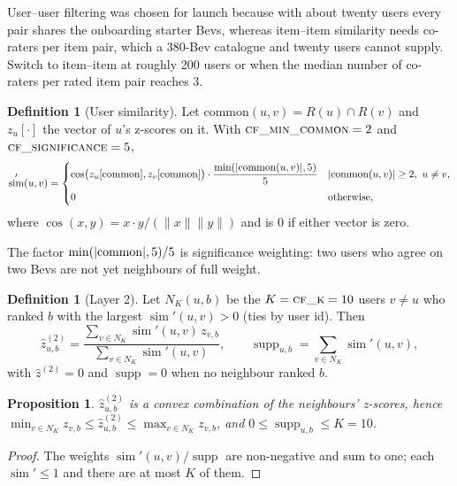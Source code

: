 \documentclass[11pt]{article}
\DeclarePairedDelimiter\abs{\lvert}{\rvert}
\DeclareMathOperator{\simi}{sim}
\DeclareMathOperator{\cosim}{cos}
\DeclareMathOperator{\supp}{supp}
\newcommand{\zhat}{\hat{z}}
\theoremstyle{plain}
\newtheorem{proposition}[theorem]{Proposition}
\theoremstyle{definition}
\newtheorem{definition}[theorem]{Definition}
\theoremstyle{remark}
\begin{document}
User--user filtering was chosen for launch because with about twenty users every pair shares the onboarding starter Bevs, whereas item--item similarity needs co-raters per item pair, which a 380-Bev catalogue and twenty users cannot supply. Switch to item--item at roughly 200 users or when the median number of co-raters per rated item pair reaches 3.

\begin{definition}[User similarity]\label{def:usersim}
Let $\mathrm{common}(u, v) = R(u) \cap R(v)$ and $z_u[\cdot]$ the vector of $u$'s z-scores on it. With $\textsc{cf\_min\_common} = 2$ and $\textsc{cf\_significance} = 5$,
\begin{equation}\label{eq:usersim}
\simi'(u, v) =
\begin{cases}
\cosim\bigl(z_u[\mathrm{common}], z_v[\mathrm{common}]\bigr) \cdot \dfrac{\min(\abs{\mathrm{common}(u,v)}, 5)}{5} & \abs{\mathrm{common}(u, v)} \ge 2,\ u \ne v, \\[8pt]
0 & \text{otherwise,}
\end{cases}
\end{equation}
where $\cosim(x, y) = x \cdot y / (\lVert x \rVert \lVert y \rVert)$ and is $0$ if either vector is zero.
\end{definition}

The factor $\min(\abs{\mathrm{common}}, 5)/5$ is significance weighting: two users who agree on two Bevs are not yet neighbours of full weight.

\begin{definition}[Layer 2]\label{def:layer2}
Let $N_K(u, b)$ be the $K = \textsc{cf\_k} = 10$ users $v \ne u$ who ranked $b$ with the largest $\simi'(u, v) > 0$ (ties by user id). Then
\begin{equation}\label{eq:z2}
\zhat^{(2)}_{u,b} = \frac{\sum_{v \in N_K} \simi'(u,v)\, z_{v,b}}{\sum_{v \in N_K} \simi'(u,v)}, \qquad \supp_{u,b} = \sum_{v \in N_K} \simi'(u, v),
\end{equation}
with $\zhat^{(2)} = 0$ and $\supp = 0$ when no neighbour ranked $b$.
\end{definition}

\begin{proposition}\label{prop:z2}
$\zhat^{(2)}_{u,b}$ is a convex combination of the neighbours' z-scores, hence $\min_{v \in N_K} z_{v,b} \le \zhat^{(2)}_{u,b} \le \max_{v \in N_K} z_{v,b}$, and $0 \le \supp_{u,b} \le K = 10$.
\end{proposition}
\begin{proof}
The weights $\simi'(u,v)/\supp$ are non-negative and sum to one; each $\simi' \le 1$ and there are at most $K$ of them.
\end{proof}
\end{document}
